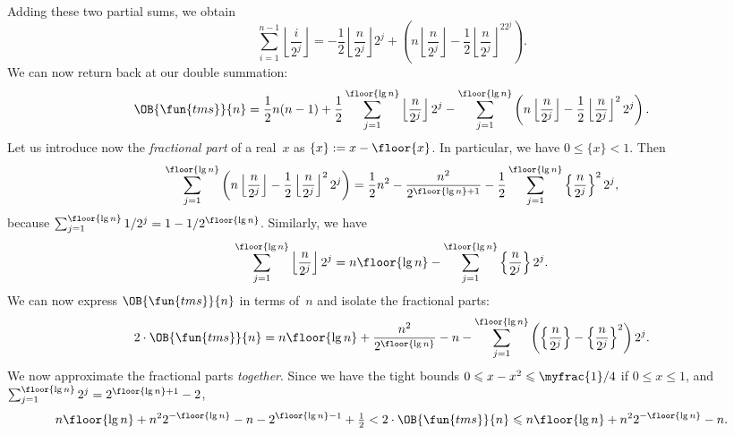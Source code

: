 Adding these two partial sums, we obtain
\begin{equation*}
\sum_{i=1}^{n-1}\left\lfloor\frac{i}{2^j}\right\rfloor
= -\frac{1}{2}\left\lfloor\frac{n}{2^j}\right\rfloor 2^j
  + \left(n\left\lfloor\frac{n}{2^j}\right\rfloor
  - \frac{1}{2}\left\lfloor\frac{n}{2^j}\right\rfloor^22^j\right).
\end{equation*}
We can now return back at our double summation:
\begin{equation*}
\OB{\fun{tms}}{n} =
    \frac{1}{2}n(n-1)
  + \frac{1}{2}\sum_{j=1}^{\floor{\lg n}}
      \left\lfloor\frac{n}{2^j}\right\rfloor{2^j}
  - \sum_{j=1}^{\floor{\lg n}}
      \left(n\left\lfloor\frac{n}{2^j}\right\rfloor
      - \frac{1}{2}\left\lfloor\frac{n}{2^j}\right\rfloor^22^j\right).
\index{tms@$\OB{\fun{tms}}{n}$}
\end{equation*}
Let us introduce now the \emph{fractional part} of a
real~\(x\) as \(\{x\} := x - \floor{x}\). In particular, we have \(0
\leqslant \{x\} < 1\). Then
\begin{equation*}
\sum_{j=1}^{\floor{\lg n}}
      \left(n\left\lfloor\frac{n}{2^j}\right\rfloor
      - \frac{1}{2}\left\lfloor\frac{n}{2^j}\right\rfloor^22^j\right)
= \frac{1}{2}n^2 - \frac{n^2}{2^{\floor{\lg n}+1}}
  - \frac{1}{2}\sum_{j=1}^{\floor{\lg n}}\left\lbrace\frac{n}{2^j}\right\rbrace^22^j,
\end{equation*}
because \(\sum_{j=1}^{\floor{\lg n}}{1/2^j} = 1 - 1/2^{\floor{\lg
    n}}\). Similarly, we have
\begin{equation*}
\sum_{j=1}^{\floor{\lg n}}
      \left\lfloor\frac{n}{2^j}\right\rfloor{2^j}
= n\floor{\lg n}
- \sum_{j=1}^{\floor{\lg n}}\left\lbrace\frac{n}{2^j}\right\rbrace 2^j.
\end{equation*}
We can now express \(\OB{\fun{tms}}{n}\) in terms of~\(n\) and isolate
the fractional parts:
\begin{equation*}
2 \cdot \OB{\fun{tms}}{n} =
  n\floor{\lg n} + \frac{n^2}{2^{\floor{\lg n}}}
  - n
  - \sum_{j=1}^{\floor{\lg n}}
    \left(\left\lbrace\frac{n}{2^j}\right\rbrace -
    \left\lbrace\frac{n}{2^j}\right\rbrace^2\right)2^j.
\end{equation*}
We now approximate the fractional parts \emph{together}. Since we have
the tight bounds \(0 \leqslant x - x^2 \leqslant \myfrac{1}/{4}\) if
\(0 \leqslant x \leqslant 1\), and \(\sum_{j=1}^{\floor{\lg n}}2^j =
2^{\floor{\lg n}+1} - 2\),
\begin{equation*}
n\floor{\lg n} + n^22^{-\floor{\lg n}} - n - 2^{\floor{\lg n}-1} +
\tfrac{1}{2} < 2 \cdot \OB{\fun{tms}}{n} \leqslant n\floor{\lg n} +
n^22^{-\floor{\lg n}} - n.
\end{equation*}
